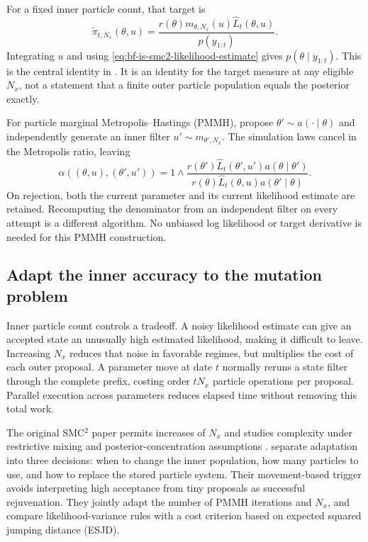 For a fixed inner particle count, that target is
\begin{equation}
 \widetilde\pi_{t,N_x}(\theta,u)
 =\frac{r(\theta)m_{\theta,N_x}(u)
                    \widehat L_t(\theta,u)}{p(y_{1:t})}.
 \label{eq:bf-is-smc2-extended}
\end{equation}
Integrating $u$ and using \eqref{eq:bf-is-smc2-likelihood-estimate}
gives $p(\theta\mid y_{1:t})$. This is the central identity in
\citet[Equation 7 and Proposition 1]{chopin2013smc2}. It is an identity
for the target measure at any eligible $N_x$, not a statement that a
finite outer particle population equals the posterior exactly.

For particle marginal Metropolis--Hastings (PMMH), propose
$\theta'\sim a(\cdot\mid\theta)$ and independently generate an inner
filter $u'\sim m_{\theta',N_x}$. The simulation laws cancel in the
Metropolis ratio, leaving
\begin{equation}
 \alpha((\theta,u),(\theta',u'))=1\wedge
 \frac{r(\theta')\widehat L_t(\theta',u')a(\theta\mid\theta')}
      {r(\theta)\widehat L_t(\theta,u)a(\theta'\mid\theta)}.
 \label{eq:bf-is-smc2-pmmh}
\end{equation}
On rejection, both the current parameter and its current likelihood estimate
are retained. Recomputing the denominator from an independent filter on every
attempt is a different algorithm. No unbiased log likelihood or target
derivative is needed for this PMMH construction.

\subsection{Adapt the inner accuracy to the mutation problem}

Inner particle count controls a tradeoff. A noisy likelihood estimate can
give an accepted state an unusually high estimated likelihood, making it
difficult to leave. Increasing $N_x$ reduces that noise in favorable
regimes, but multiplies the cost of each outer proposal. A parameter move
at date $t$ normally reruns a state filter through the complete prefix,
costing order $tN_x$ particle operations per proposal. Parallel execution
across parameters reduces elapsed time without removing this total work.

The original SMC$^2$ paper permits increases of $N_x$ and studies complexity
under restrictive mixing and posterior-concentration assumptions
\citep[Sections 3.6--3.7 and Appendix B]{chopin2013smc2}.
\citet[Sections 3--4]{botha2023adaptivesmc2} separate adaptation into three
decisions: when to change the inner population, how many particles to use,
and how to replace the stored particle system. Their movement-based
trigger avoids interpreting high acceptance from tiny proposals as
successful rejuvenation. They jointly adapt the number of PMMH iterations
and $N_x$, and compare likelihood-variance rules with a cost criterion
based on expected squared jumping distance (ESJD).

